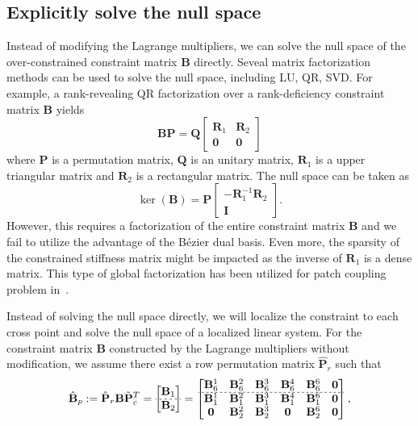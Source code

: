 \documentclass[preprint,12pt]{elsarticle}
\newcommand{\Bezier}{{B\'{e}zier} }
\begin{document}
\subsection{Explicitly solve the null space}
Instead of modifying the Lagrange multipliers, we can solve the null space of the over-constrained constraint matrix $\mathbf{B}$ directly. Seveal matrix factorization methods can be used to solve the null space, including LU, QR, SVD. For example, a rank-revealing QR factorization over a rank-deficiency constraint matrix $\mathbf{B}$ yields
\begin{equation}
    \mathbf{B}\mathbf{P}=
    \mathbf{Q}
    \begin{bmatrix}
        \mathbf{R}_1 & \mathbf{R}_2 \\
        \mathbf{0} & \mathbf{0}
    \end{bmatrix}
\end{equation}
where $\mathbf{P}$ is a permutation matrix, $\mathbf{Q}$ is an unitary matrix, $\mathbf{R}_1$ is a upper triangular matrix and $\mathbf{R}_2$ is a rectangular matrix. The null space can be taken as 
\begin{equation}
    \ker(\mathbf{B})=
    \mathbf{P}
    \begin{bmatrix}
        -\mathbf{R}_1^{-1}\mathbf{R}_2\\
        \mathbf{I}
    \end{bmatrix}.\label{eq:direct_kernel}
\end{equation}
However, this requires a factorization of the entire constraint matrix $\mathbf{B}$ and we fail to utilize the advantage of the \Bezier dual basis. Even more, the sparsity of the constrained stiffness matrix might be impacted as the inverse of $\mathbf{R}_1$ is a dense matrix. This type of global factorization has been utilized for patch coupling problem in~\cite{coox_robust_2017, coox2017flexible, dornisch2017dual}.\par
Instead of solving the null space directly, we will localize the constraint to each cross point and solve the null space of a localized linear system. For the constraint matrix $\mathbf{B}$ constructed by the Lagrange multipliers without modification, we assume there exist a row permutation matrix $\hat{\mathbf{P}}_r$ such that
\begin{equation}
    \hat{\mathbf{B}}_p:=\hat{\mathbf{P}}_r\mathbf{B}\tilde{\mathbf{P}}_c^T=
    \begin{bmatrix}
        {\mathbf{B}}_1\\  \hdashline[2pt/2pt]
        {\mathbf{B}}_2
    \end{bmatrix}
    =
    \begin{bmatrix}
        \mathbf{B}_6^1 & \mathbf{B}_6^2 & \mathbf{B}_6^3 & \mathbf{B}_6^4 & \mathbf{B}_6^6 & \mathbf{0} \\ \hdashline[2pt/2pt]
        \mathbf{B}_1^1 & \mathbf{B}_1^2 & \mathbf{B}_1^3 & \mathbf{B}_1^4 & \mathbf{B}_1^6 & \mathbf{0} \\
        \mathbf{0} & \mathbf{B}_2^2 & \mathbf{B}_2^3 & \mathbf{0} & \mathbf{B}_2^6 & \mathbf{0}
    \end{bmatrix},
\end{equation}
\end{document}
